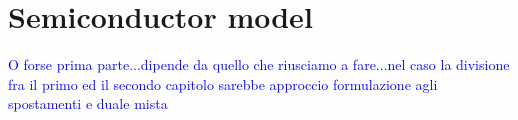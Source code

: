 \chapter{Semiconductor model}

\textcolor{blue}{O forse prima parte...dipende da quello che riusciamo a fare...nel caso la divisione fra il primo ed il secondo capitolo sarebbe approccio formulazione agli spostamenti e duale mista}



\clearpage



\clearpage



\clearpage

